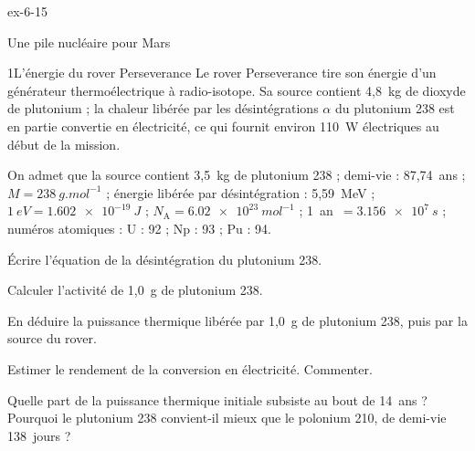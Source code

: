 \begin{blocLivre}{ex-6-15}
\begin{exercice}[3]{Une pile nucléaire pour Mars}
\begin{docu}{1}{L'énergie du rover Perseverance}
Le rover Perseverance tire son énergie d'un générateur thermoélectrique à radio-isotope. Sa source contient 4,8~kg de
dioxyde de plutonium ; la chaleur libérée par les désintégrations $\alpha$ du plutonium 238 est en partie convertie
en électricité, ce qui fournit environ 110~W électriques au début de la mission.
\end{docu}
\begin{donnees}
On admet que la source contient 3,5~kg de plutonium 238 ; demi-vie : 87,74~ans ; $M=\qty{238}{g.mol^{-1}}$ ;
énergie libérée par désintégration : 5,59~MeV ; $\qty{1}{eV}=\qty{1,602e-19}{J}$ ; $N_\mathrm{A}=\qty{6,02e23}{mol^{-1}}$ ;
\mbox{1 an $=\qty{3,156e7}{s}$} ; numéros atomiques : U : 92 ; Np : 93 ; Pu : 94.
\end{donnees}
\begin{questions}
\item Écrire l'équation de la désintégration du plutonium 238.
\item Calculer l'activité de 1,0~g de plutonium 238.
\item En déduire la puissance thermique libérée par 1,0~g de plutonium 238, puis par la source du rover.
\item \initiative Estimer le rendement de la conversion en électricité. Commenter.
\item Quelle part de la puissance thermique initiale subsiste au bout de 14~ans ? Pourquoi le plutonium 238
convient-il mieux que le polonium 210, de demi-vie 138~jours ?
\end{questions}
\end{exercice}
\end{blocLivre}
